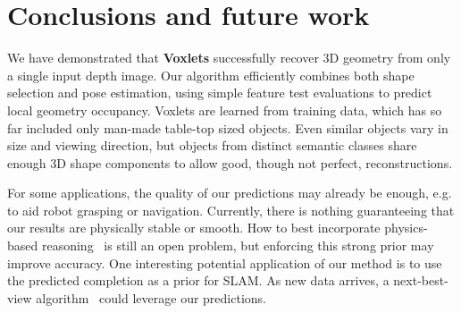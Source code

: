\documentclass[10pt,twocolumn,letterpaper]{article}
\makeatletter
\renewcommand*{\eg}{e.g.\@\xspace}
\makeatother
\begin{document}
\section{Conclusions and future work}
We have demonstrated that {\bf Voxlets} successfully recover 3D geometry from only a single input depth image. Our algorithm efficiently combines both shape selection and pose estimation, using simple feature test evaluations to predict local geometry occupancy.
Voxlets are learned from training data, which has so far included only man-made table-top sized objects. Even similar objects vary in size and viewing direction, but objects from distinct semantic classes share enough 3D shape components to allow good, though not perfect, reconstructions.

For some applications, the quality of our predictions may already be enough, \eg to aid robot grasping or navigation. Currently, there is nothing guaranteeing that our results are physically stable or smooth.
How to best incorporate physics-based reasoning~\cite{zheng-cvpr-2013, shao-siggraphasia-2014} is still an open problem, but enforcing this strong prior may improve accuracy. %
One interesting potential application of our method is to use the predicted completion as a prior for SLAM.
As new data arrives, a next-best-view algorithm~\cite{Potthast2014148} could leverage our predictions.





\pagebreak
{\fontsize{9}{10}\selectfont


}
\end{document}
